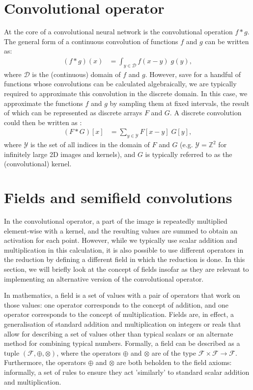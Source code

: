 \documentclass[a4paper, 12pt]{report}
\begin{document}
\section{Convolutional operator}
At the core of a convolutional neural network is the convolutional operation $f*g$. The general form of a continuous convolution of functions $f$ and $g$ can be written as:
\begin{align}
(f*g)(x) &= \int_{y\in\mathcal{D}} f(x-y)\; g(y)	,
\end{align}
where $\mathcal{D}$ is the (continuous) domain of $f$ and $g$. However, save for a handful of functions whose convolutions can be calculated algebraically, we are typically required to approximate this convolution in the discrete domain. In this case, we approximate the functions $f$ and $g$ by sampling them at fixed intervals, the result of which can be represented as discrete arrays $F$ and $G$. A discrete convolution could then be written as \cite{szeliski2022computer}:
\begin{align}
(F*G)[x] &= \sum_{y\in\mathcal{Y}} F[x-y]\; G[y],
\end{align}
where $\mathcal{Y}$ is the set of all indices in the domain of $F$ and $G$ (e.g. $\mathcal{Y}=\mathbb{Z}^2$ for infinitely large 2D images and kernels), and $G$ is typically referred to as the (convolutional) kernel.


\section{Fields and semifield convolutions}
In the convolutional operator, a part of the image is repeatedly multiplied element-wise with a kernel, and the resulting values are summed to obtain an activation for each point. However, while we typically use scalar addition and multiplication in this calculation, it is also possible to use different operators in the reduction by defining a different field in which the reduction is done. In this section, we will briefly look at the concept of fields insofar as they are relevant to implementing an alternative version of the convolutional operator.

In mathematics, a field is a set of values with a pair of operators that work on those values: one operator corresponds to the concept of addition, and one operator corresponds to the concept of multiplication. Fields are, in effect, a generalisation of standard addition and multiplication on integers or reals that allow for describing a set of values other than typical scalars or an alternate method for combining typical numbers. Formally, a field can be described as a tuple $(\mathcal{F}, \oplus, \otimes)$, where the operators $\oplus$ and $\otimes$ are of the type $\mathcal{F}\times\mathcal{F}\rightarrow\mathcal{F}$. Furthermore, the operators $\oplus$ and $\otimes$ are both beholden to the field axioms: informally, a set of rules to ensure they act 'similarly' to standard scalar addition and multiplication. 
\end{document}
